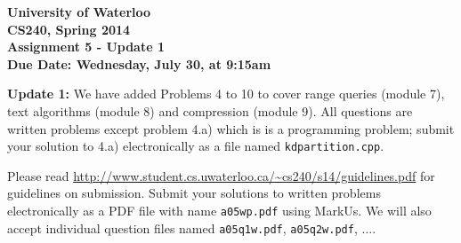 \documentclass[12pt]{article}
\begin{document}
\begin{center}
  {\Large\bf University of Waterloo}\\ \vspace{3mm}
  {\Large\bf CS240, Spring 2014}\\ \vspace{2mm}
  {\Large\bf Assignment 5 - Update 1}\\ \vspace{3mm}
  \textbf{Due Date: Wednesday, July 30, at 9:15am}
\end{center}

\def\question#1{\item[\bf #1.]}
\def\part#1{\item[\bf #1)]}
\newcommand{\pc}[1]{\mbox{\textbf{#1}}} %

\textbf{Update 1: } We have added Problems 4 to 10 to cover
range queries (module 7), text algorithms (module 8) and
compression (module 9).
All questions are written problems except problem 4.a) which is
is a programming problem; submit your solution to 4.a) electronically
as a file named {\tt kdpartition.cpp}.

Please read
\url{http://www.student.cs.uwaterloo.ca/~cs240/s14/guidelines.pdf} for
guidelines on submission.
Submit your solutions to written problems electronically as a PDF file with
name {\tt a05wp.pdf} using MarkUs. We will also accept individual
question files named {\tt a05q1w.pdf}, {\tt a05q2w.pdf}, $\dots$.

\end{document}
